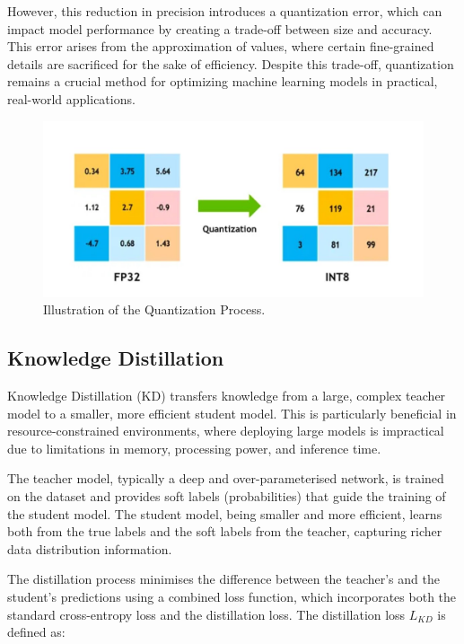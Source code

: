 \documentclass[conference,letterpaper]{IEEEtran}
\begin{document}
However, this reduction in precision introduces a quantization error, which can impact model performance by creating a trade-off between size and accuracy. This error arises from the approximation of values, where certain fine-grained details are sacrificed for the sake of efficiency. Despite this trade-off, quantization remains a crucial method for optimizing machine learning models in practical, real-world applications.

\begin{figure}[h]
    \centering
    \includegraphics[width=\linewidth]{Quantized .jpg} %
    \caption{Illustration of the Quantization Process.} %
    \label{fig:quantization}
\end{figure}


\subsection{Knowledge Distillation}


Knowledge Distillation (KD) transfers knowledge from a large, complex teacher model to a smaller, more efficient student model. This is particularly beneficial in resource-constrained environments, where deploying large models is impractical due to limitations in memory, processing power, and inference time.

The teacher model, typically a deep and over-parameterised network, is trained on the dataset and provides soft labels (probabilities) that guide the training of the student model. The student model, being smaller and more efficient, learns both from the true labels and the soft labels from the teacher, capturing richer data distribution information.

The distillation process minimises the difference between the teacher's and the student’s predictions using a combined loss function, which incorporates both the standard cross-entropy loss and the distillation loss. The distillation loss \( L_{KD} \) is defined as:
\end{document}
